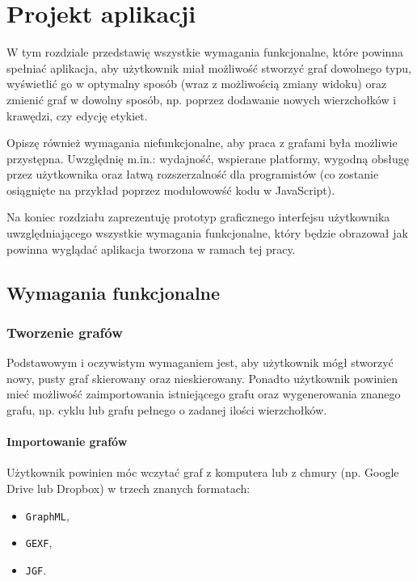 \chapter{Projekt aplikacji}\label{ch:project}

W tym rozdziale przedstawię wszystkie wymagania funkcjonalne, które powinna spełniać aplikacja, aby użytkownik miał możliwość stworzyć graf dowolnego typu, wyświetlić go w optymalny sposób (wraz z możliwością zmiany widoku) oraz zmienić graf w dowolny sposób, np. poprzez dodawanie nowych wierzchołków i krawędzi, czy edycję etykiet. 

Opiszę również wymagania niefunkcjonalne, aby praca z grafami była możliwie przystępna. Uwzględnię m.in.: wydajność, wspierane platformy, wygodną obsługę przez użytkownika oraz łatwą rozszerzalność dla programistów (co zostanie osiągnięte na przykład poprzez modułowowść kodu w JavaScript).

Na koniec rozdziału zaprezentuję prototyp graficznego interfejsu użytkownika uwzględniającego wszystkie wymagania funkcjonalne, który będzie obrazował jak powinna wyglądać aplikacja tworzona w ramach tej pracy. 

\section{Wymagania funkcjonalne}

\subsection{Tworzenie grafów}
Podstawowym i oczywistym wymaganiem jest, aby użytkownik mógł stworzyć nowy, pusty graf skierowany oraz nieskierowany. Ponadto użytkownik powinien mieć możliwość zaimportowania istniejącego grafu oraz wygenerowania znanego grafu, np. cyklu lub grafu pełnego o zadanej ilości wierzchołków. 

\subsubsection{Importowanie grafów} \label{subsubsec:import}
Użytkownik powinien móc wczytać graf z komputera lub z chmury (np. Google Drive lub Dropbox) w trzech znanych formatach: 

\begin{itemize}
\setlength\itemsep{0em}
\item \texttt{GraphML},
\item \texttt{GEXF},
\item \texttt{JGF}.
\end{itemize}

